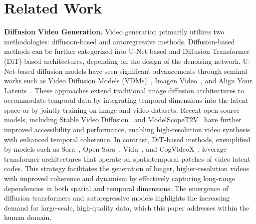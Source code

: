 \section{Related Work}
\noindent\textbf{Diffusion Video Generation.}
Video generation primarily utilizes two methodologies: diffusion-based and autoregressive methods. Diffusion-based methods can be further categorized into U-Net-based and Diffusion Transformer (DiT)-based architectures, depending on the design of the denoising network.
U-Net-based diffusion models have seen significant advancements through seminal works such as Video Diffusion Models (VDMs)~\cite{ho2022video}, Imagen Video~\cite{ho2022imagen}, and Align Your Latents~\cite{blattmann2023align}. These approaches extend traditional image diffusion architectures to accommodate temporal data by integrating temporal dimensions into the latent space or by jointly training on image and video datasets. Recent open-source models, including Stable Video Diffusion~\cite{blattmann2023stable} and ModelScopeT2V~\cite{wang2023modelscope} have further improved accessibility and performance, enabling high-resolution video synthesis with enhanced temporal coherence.
In contrast, DiT-based methods, exemplified by models such as Sora~\cite{liu2024sora}, Open-Sora~\cite{opensora}, Vidu~\cite{bao2024vidu}, and CogVideoX~\cite{yang2024cogvideox}, leverage transformer architectures that operate on spatiotemporal patches of video latent codes. This strategy facilitates the generation of longer, higher-resolution videos with improved coherence and dynamism by effectively capturing long-range dependencies in both spatial and temporal dimensions. The emergence of diffusion transformers and autoregressive models highlights the increasing demand for large-scale, high-quality data, which this paper addresses within the human domain.

